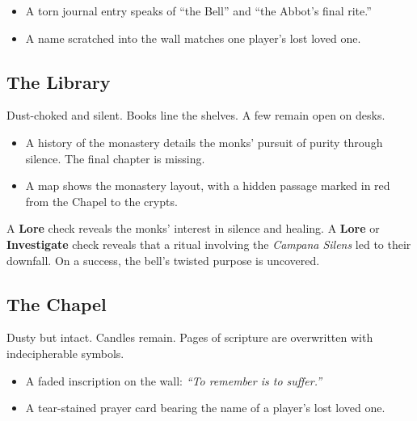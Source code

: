 \documentclass[nodeprecatedcode,bg=print]{dndbook}
\begin{document}
\begin{paracol}{2}
    \begin{Example}{}
        \begin{itemize}
            \item A torn journal entry speaks of “the Bell” and “the Abbot’s final rite.”
            \item A name scratched into the wall matches one player’s lost loved one.
        \end{itemize}
    \end{Example}

    \switchcolumn
    \subsection{The Library}
    Dust-choked and silent. Books line the shelves. A few remain open on desks.

    \begin{Example}{}
        \begin{itemize}
            \item A history of the monastery details the monks’ pursuit of purity through silence. The final chapter is missing.
            \item A map shows the monastery layout, with a hidden passage marked in red from the Chapel to the crypts.
        \end{itemize}
    \end{Example}

    A  \textbf{Lore} check reveals the monks' interest in silence and healing. A  \textbf{Lore} or \textbf{Investigate} check reveals that a ritual involving the \emph{Campana Silens} led to their downfall. On a  success, the bell's twisted purpose is uncovered.

    \subsection{The Chapel}
    Dusty but intact. Candles remain. Pages of scripture are overwritten with indecipherable symbols.

    \begin{Example}{}
        \begin{itemize}
            \item A faded inscription on the wall: \emph{“To remember is to suffer.”}
            \item A tear-stained prayer card bearing the name of a player’s lost loved one.
        \end{itemize}
    \end{Example}


\end{paracol}
\end{document}
